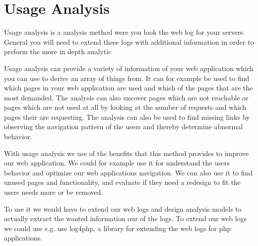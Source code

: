 \section{Usage Analysis}
Usage analysis is a analysis method were you look the web log for your servers. General you will need to extend these logs with additional information in order to preform the more in depth analytic

Usage analysis can provide a variety of information of your web application which you can use to derive an array of things from. It can for example be used to find which pages in your web application are used and which of the pages that are the most demanded. The analysis can also uncover pages which are not reachable or pages which are not used at all by looking at the number of requests and which pages their are requesting.
The analysis can also be used to find missing links by observing the navigation pattern of the users and thereby determine abnormal behavior.

With usage analysis we use of the benefits that this method provides to improve our web application. We could for example use it for understand the users behavior and optimize our web applications navigation. We can also use it to find unused pages and functionality, and evaluate if they need a redesign to fit the users needs more or be removed.

To use it we would have to extend our web logs and design analysis models to actually extract the wanted information our of the logs. To extend our web logs we could use e.g. use log4php, a library for extending the web logs for php applications. 
